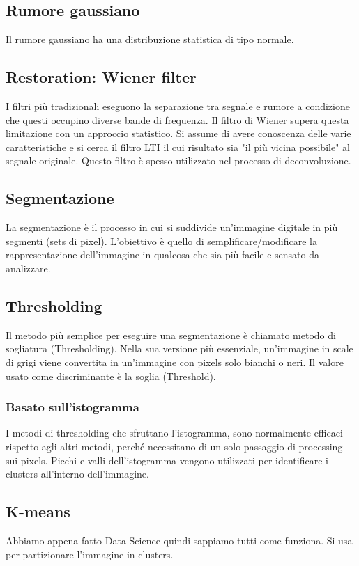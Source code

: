 \documentclass[8pt,a4paper]{article}
\begin{document}
\begin{multicols}{5}
    \subsection{Rumore gaussiano}
    Il rumore gaussiano ha una distribuzione statistica di tipo normale. 
    \subsection{Restoration: Wiener filter}
    I filtri più tradizionali eseguono la separazione tra segnale e rumore a condizione 
    che questi occupino diverse bande di frequenza. Il filtro di Wiener supera questa 
    limitazione con un approccio statistico. Si assume di avere conoscenza delle varie 
    caratteristiche e si cerca il filtro LTI il cui risultato sia "il più vicina 
    possibile" al segnale originale. Questo filtro è spesso utilizzato nel processo
    di deconvoluzione.
    \subsection{Segmentazione}
    La segmentazione è il processo in cui si suddivide un’immagine digitale in più 
    segmenti (sets di pixel). L'obiettivo è quello di semplificare/modificare la 
    rappresentazione dell’immagine in qualcosa che sia più facile e sensato 
    da analizzare.
    \subsection{Thresholding}
    Il metodo più semplice per eseguire una segmentazione è chiamato metodo di 
    sogliatura (Thresholding). Nella sua versione più essenziale, un’immagine 
    in scale di grigi viene convertita in un’immagine con pixels solo bianchi 
    o neri. Il valore usato come discriminante è la soglia (Threshold).
    \subsubsection{Basato sull’istogramma}
    I metodi di thresholding che sfruttano l’istogramma, sono normalmente efficaci
    rispetto agli altri metodi, perché necessitano di un solo passaggio di 
    processing sui pixels. Picchi e valli dell’istogramma vengono utilizzati 
    per identificare i clusters all’interno dell’immagine.
    \subsection{K-means}
    Abbiamo appena fatto Data Science quindi sappiamo tutti come funziona. Si usa
    per partizionare l'immagine in clusters.

\end{multicols}
\end{document}

